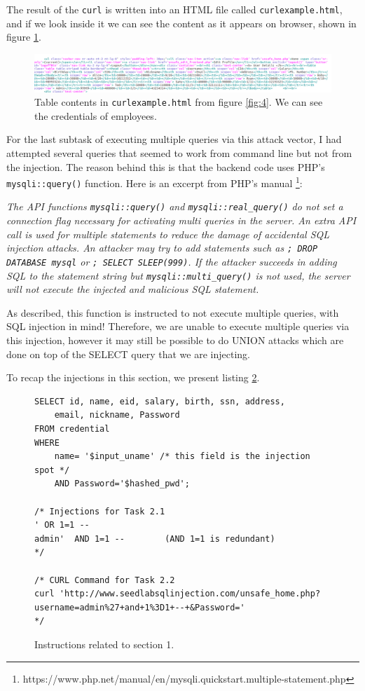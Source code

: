 \documentclass[12pt,reqno]{amsart}
\newcommand{\code}[1]{\texttt{#1}}
\begin{document}
The result of the \code{curl} is written into an HTML file called \code{curlexample.html}, and if we look inside it we can see the content as it appears on browser, shown in figure \ref{fig:5}.

\begin{figure}[h]
  \includegraphics[width=\linewidth]{img/CURL_EXAMPLE_GEDIT.png}
  \caption{Table contents in \code{curlexample.html} from figure \ref{fig:4}. We can see the credentials of employees.}
  \label{fig:5}
\end{figure}

For the last subtask of executing multiple queries via this attack vector, I had attempted several queries that seemed to work from command line but not from the injection. The reason behind this is that the backend code uses PHP's \code{mysqli::query()} function. Here is an excerpt from PHP's manual \footnote{https://www.php.net/manual/en/mysqli.quickstart.multiple-statement.php}: 

\textit{The API functions \code{mysqli::query()} and \code{mysqli::real\_query()} do not set a connection flag necessary for activating multi queries in the server. An extra API call is used for multiple statements to reduce the damage of accidental SQL injection attacks. An attacker may try to add statements such as \code{; DROP DATABASE mysql} or \code{; SELECT SLEEP(999)}. If the attacker succeeds in adding SQL to the statement string but \code{mysqli::multi\_query()} is not used, the server will not execute the injected and malicious SQL statement.}

As described, this function is instructed to not execute multiple queries, with SQL injection in mind! Therefore, we are unable to execute multiple queries via this injection, however it may still be possible to do UNION attacks which are done on top of the SELECT query that we are injecting.

To recap the injections in this section, we present listing \ref{lst:1}.
\begin{figure}[h]
  \begin{lstlisting}[style=SQLStyle, firstnumber=1]
SELECT id, name, eid, salary, birth, ssn, address, 
	email, nickname, Password
FROM credential
WHERE 
	name= '$input_uname' /* this field is the injection spot */
	AND Password='$hashed_pwd';

/* Injections for Task 2.1
' OR 1=1 -- 
admin'  AND 1=1 --        (AND 1=1 is redundant)
*/

/* CURL Command for Task 2.2
curl 'http://www.seedlabsqlinjection.com/unsafe_home.php?username=admin%27+and+1%3D1+--+&Password='
*/

\end{lstlisting}
  \caption{Instructions related to section 1.}
  \label{lst:1}
\end{figure}
\end{document}
